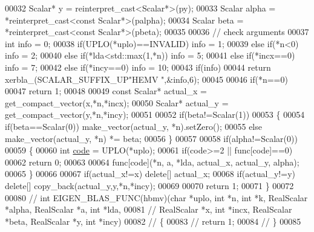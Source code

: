 \begin{DoxyCode}
00032   Scalar* y = \textcolor{keyword}{reinterpret\_cast<}Scalar*\textcolor{keyword}{>}(py);
00033   Scalar alpha  = *\textcolor{keyword}{reinterpret\_cast<}\textcolor{keyword}{const }Scalar*\textcolor{keyword}{>}(palpha);
00034   Scalar beta   = *\textcolor{keyword}{reinterpret\_cast<}\textcolor{keyword}{const }Scalar*\textcolor{keyword}{>}(pbeta);
00035 
00036   \textcolor{comment}{// check arguments}
00037   \textcolor{keywordtype}{int} info = 0;
00038   \textcolor{keywordflow}{if}(UPLO(*uplo)==INVALID)        info = 1;
00039   \textcolor{keywordflow}{else} \textcolor{keywordflow}{if}(*n<0)                   info = 2;
00040   \textcolor{keywordflow}{else} \textcolor{keywordflow}{if}(*lda<std::max(1,*n))    info = 5;
00041   \textcolor{keywordflow}{else} \textcolor{keywordflow}{if}(*incx==0)               info = 7;
00042   \textcolor{keywordflow}{else} \textcolor{keywordflow}{if}(*incy==0)               info = 10;
00043   \textcolor{keywordflow}{if}(info)
00044     \textcolor{keywordflow}{return} xerbla\_(SCALAR\_SUFFIX\_UP\textcolor{stringliteral}{"HEMV "},&info,6);
00045 
00046   \textcolor{keywordflow}{if}(*n==0)
00047     \textcolor{keywordflow}{return} 1;
00048 
00049   \textcolor{keyword}{const} Scalar* actual\_x = get\_compact\_vector(x,*n,*incx);
00050   Scalar* actual\_y = get\_compact\_vector(y,*n,*incy);
00051 
00052   \textcolor{keywordflow}{if}(beta!=Scalar(1))
00053   \{
00054     \textcolor{keywordflow}{if}(beta==Scalar(0)) make\_vector(actual\_y, *n).setZero();
00055     \textcolor{keywordflow}{else}                make\_vector(actual\_y, *n) *= beta;
00056   \}
00057 
00058   \textcolor{keywordflow}{if}(alpha!=Scalar(0))
00059   \{
00060     \textcolor{keywordtype}{int} \hyperlink{structcode}{code} = UPLO(*uplo);
00061     \textcolor{keywordflow}{if}(code>=2 || func[code]==0)
00062       \textcolor{keywordflow}{return} 0;
00063 
00064     func[code](*n, a, *lda, actual\_x, actual\_y, alpha);
00065   \}
00066 
00067   \textcolor{keywordflow}{if}(actual\_x!=x) \textcolor{keyword}{delete}[] actual\_x;
00068   \textcolor{keywordflow}{if}(actual\_y!=y) \textcolor{keyword}{delete}[] copy\_back(actual\_y,y,*n,*incy);
00069 
00070   \textcolor{keywordflow}{return} 1;
00071 \}
00072 
00080 \textcolor{comment}{// int EIGEN\_BLAS\_FUNC(hbmv)(char *uplo, int *n, int *k, RealScalar *alpha, RealScalar *a, int *lda,}
00081 \textcolor{comment}{//                           RealScalar *x, int *incx, RealScalar *beta, RealScalar *y, int *incy)}
00082 \textcolor{comment}{// \{}
00083 \textcolor{comment}{//   return 1;}
00084 \textcolor{comment}{// \}}
00085 

\end{DoxyCode}
